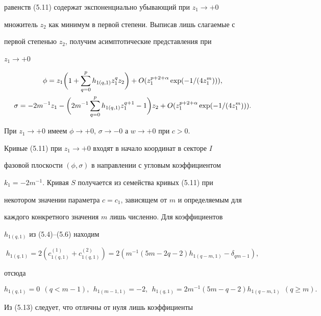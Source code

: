 равенств (5.11) содержат экспоненциально убывающий при $z_1\to+0$ 


множитель $z_2$ как минимум в первой степени. Выписав лишь слагаемые с 


первой степенью $z_2$, получим асимптотические представления при 


$z_1\to+0$ 


\begin{gather} 


\phi=z_1\bigg(1+\sum^p_{q=0}h_{1(q,1)}z^q_1z_2\bigg)+ 


O(z^{p+2+\alpha}_1\exp(-1/(4z^m_1))),\\ 


\sigma=-2m^{-1}z_1-\bigg(2m^{-1}\sum^p_{q=0} 


h_{1(q,1)}z^{q+1}_1-1\bigg)z_2+ 


O(z^{p+2+\alpha}_1\exp(-1/(4z^m_1))).\notag 


\end{gather} 


При $z_1\to+0$ имеем $\phi\to+0$, $\sigma\to-0$ а $w\to+0$ при $c>0$. 


Кривые (5.11) при $z_1\to+0$ входят в начало координат в секторе $I$ 


фазовой плоскости $(\phi,\sigma)$ в направлении с угловым коэффициентом 


$k_1=-2m^{-1}$. Кривая $S$ получается из семейства кривых (5.11) при 


некотором значении параметра $c=c_1$, зависящем от $m$ и определяемым для 


каждого конкретного значения $m$ лишь численно. Для коэффициентов 


$h_{1(q,1)}$ из (5.4)--(5.6) находим 


$$ 


h_{1(q,1)}=2(c^{(1)}_{1(q,1)}+c^{(2)}_{1(q,1)})= 


2(m^{-1}(5m-2q-2)h_{1(q-m,1)}-\delta_{qm-1}), 


$$ 


отсюда 


\begin{equation} 


h_{1(q,1)}=0\ \ (q<m-1),\ \ h_{1(m-1,1)}=-2,\ \ h_{1(q,1)}= 


2m^{-1}(5m-q-2)h_{1(q-m,1)}\ \ (q\ge m). 


\end{equation} 


Из (5.13) следует, что отличны от нуля лишь коэффициенты 


